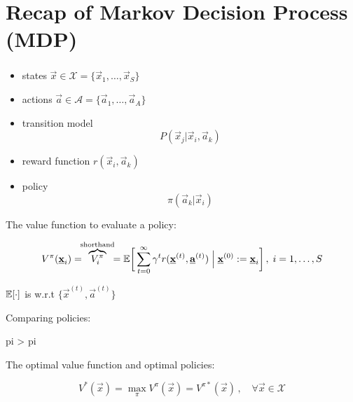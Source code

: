 \section{Recap of Markov Decision Process (MDP)}

\begin{frame}\frametitle{\secname}

\begin{itemize}
\item[] states $\vec x \in \mathcal{X} = \{ \vec x_1, \ldots, \vec x_S\}$
\item[] actions $\vec a \in \mathcal{A} = \{ \vec a_1, \ldots, \vec a_A\}$
\item[] transition model
\begin{equation}
P(\vec x_j | \vec x_i, \vec a_k)
\end{equation}
\pause
\item[] reward function $r(\vec x_i, \vec a_k)$
\item[] policy 
\begin{equation}
\pi(\vec a_k | \vec x_i)
\end{equation}

\end{itemize}

\end{frame}

\begin{frame}

The value function to evaluate a policy:

	\begin{align}
	V^\pi(\underline{\mathbf{x}}_i) = \kern-1ex \overbrace{V^\pi_i}^{\text{shorthand}} \kern-1ex = 
	\mathbb{E} \bigg\lbrack
	\sum_{t=0}^{\infty} \gamma^t r(\underline{\mathbf{x}}^{(t)}, \underline{\mathbf{a}}^{(t)}) \;\Big|\; \underline{\mathbf{x}}^{(0)} := \underline{\mathbf{x}}_i
	\bigg\rbrack\,, \; i=1,\ldots,S
	\end{align}
	
	$\mathbb{E}\lbrack\cdot\rbrack$ is w.r.t $\{\vec x^{(t)}, \vec a^{(t)}\}$
	
Comparing policies:

pi > pi

The optimal value function and optimal policies:

\begin{equation}
V^{*}(\vec x) = \max_{\pi} V^{\pi} (\vec x) = V^{\pi*}(\vec x)\,,\quad \forall \vec x \in \mathcal{X}
\end{equation}

\end{frame}
